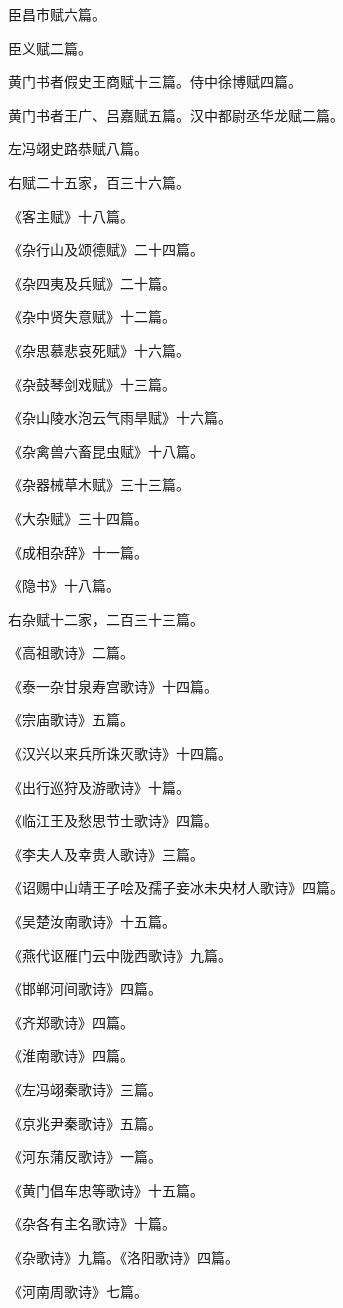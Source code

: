 \documentclass[]{article}
\begin{document}
臣昌市赋六篇。

臣义赋二篇。

黄门书者假史王商赋十三篇。侍中徐博赋四篇。

黄门书者王广、吕嘉赋五篇。汉中都尉丞华龙赋二篇。

左冯翊史路恭赋八篇。

右赋二十五家，百三十六篇。

《客主赋》十八篇。

《杂行山及颂德赋》二十四篇。

《杂四夷及兵赋》二十篇。

《杂中贤失意赋》十二篇。

《杂思慕悲哀死赋》十六篇。

《杂鼓琴剑戏赋》十三篇。

《杂山陵水泡云气雨旱赋》十六篇。

《杂禽兽六畜昆虫赋》十八篇。

《杂器械草木赋》三十三篇。

《大杂赋》三十四篇。

《成相杂辞》十一篇。

《隐书》十八篇。

右杂赋十二家，二百三十三篇。

《高祖歌诗》二篇。

《泰一杂甘泉寿宫歌诗》十四篇。

《宗庙歌诗》五篇。

《汉兴以来兵所诛灭歌诗》十四篇。

《出行巡狩及游歌诗》十篇。

《临江王及愁思节士歌诗》四篇。

《李夫人及幸贵人歌诗》三篇。

《诏赐中山靖王子哙及孺子妾冰未央材人歌诗》四篇。

《吴楚汝南歌诗》十五篇。

《燕代讴雁门云中陇西歌诗》九篇。

《邯郸河间歌诗》四篇。

《齐郑歌诗》四篇。

《淮南歌诗》四篇。

《左冯翊秦歌诗》三篇。

《京兆尹秦歌诗》五篇。

《河东蒲反歌诗》一篇。

《黄门倡车忠等歌诗》十五篇。

《杂各有主名歌诗》十篇。

《杂歌诗》九篇。《洛阳歌诗》四篇。

《河南周歌诗》七篇。
\end{document}

